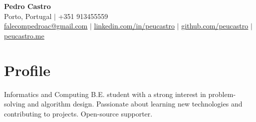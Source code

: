 






\begin{center}
  \textbf{\Huge Pedro Castro} \\ \vspace{6pt}
  \faMapMarker*{} \small{Porto, Portugal} \hspace{0.5pt} $|$ \hspace{0.5pt} \faPhone{} +351
  913455559 \\ \vspace{2pt}
  \faEnvelope{}
  \href{mailto:falecompedroac@gmail.com}{\underline{falecompedroac@gmail.com}}
  \hspace{0.5pt} $|$ \hspace{0.5pt}
  \faLinkedin{}
  \href{https://linkedin.com/in/peucastro}{\underline{linkedin.com/in/peucastro}}
  \hspace{0.5pt} $|$ \hspace{0.5pt}
  \faGithub{}
  \href{https://github.com/peucastro}{\underline{github.com/peucastro}} \hspace{0.5pt} $|$ \hspace{0.5pt}
  \faGlobe{}
  \href{https://peucastro.me}{\underline{peucastro.me}}
\end{center}

\section{Profile}
\begin{itemize}[leftmargin=0.15in, label={}]
    \small{
    \item{
        Informatics and Computing B.E. student with a strong
        interest in problem-solving and algorithm design.
        Passionate about learning new technologies and contributing
        to projects. Open-source supporter.
    }}
\end{itemize}

